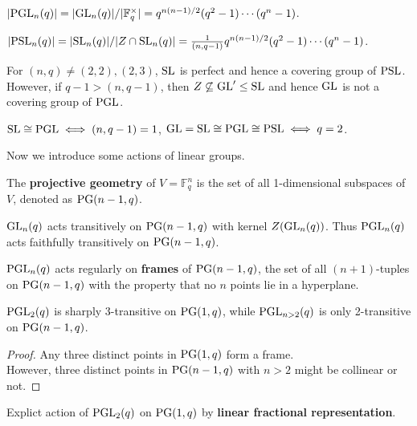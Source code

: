\documentclass[a4paper,11pt]{article}
\begin{document}
\begin{remark}
    $|\mathrm{PGL}_n(q)|=|\mathrm{GL}_n(q)|/|\mathbb{F}_q^\times|=q^{n(n-1)/2}(q^2-1)\cdots(q^n-1)$.

    $|\mathrm{PSL}_n(q)|=|\mathrm{SL}_n(q)|/|Z\cap \mathrm{SL}_n(q)|=\frac{1}{(n,q-1)}q^{n(n-1)/2}(q^2-1)\cdots(q^n-1)$.
\end{remark}

\begin{remark}
    For $(n,q)\neq (2,2),(2,3)$, $\mathrm{SL}$ is perfect and hence a covering group of $\mathrm{PSL}$. However, if $q-1>(n,q-1)$, then $Z\not\subseteq \mathrm{GL}'\leq \mathrm{SL}$ and hence $\mathrm{GL}$ is not a covering group of $\mathrm{PGL}$.
\end{remark}

\begin{proposition}
    $\mathrm{SL}\cong \mathrm{PGL} \iff (n,q-1)=1$, $\mathrm{GL}=\mathrm{SL}\cong\mathrm{PGL}\cong\mathrm{PSL} \iff q=2$.
\end{proposition}

Now we introduce some actions of linear groups.

\begin{definition}
    The \textbf{projective geometry} of $V=\mathbb{F}_q^n$ is the set of all 1-dimensional subspaces of $V$, denoted as $\mathrm{PG}(n-1,q)$.
\end{definition}

\begin{proposition}
    $\mathrm{GL}_n(q)$ acts transitively on $\mathrm{PG}(n-1,q)$ with kernel $Z(\mathrm{GL}_n(q))$. Thus $\mathrm{PGL}_n(q)$ acts faithfully transitively on $\mathrm{PG}(n-1,q)$. 
\end{proposition}


\begin{proposition}
    $\mathrm{PGL}_n(q)$ acts regularly on \textbf{frames} of $\mathrm{PG}(n-1,q)$, the set of all $(n+1)$-tuples on $\mathrm{PG}(n-1,q)$ with the property that no $n$ points lie in a hyperplane.
\end{proposition}

\begin{corollary}
    $\mathrm{PGL}_2(q)$ is sharply 3-transitive on $\mathrm{PG}(1,q)$, while $\mathrm{PGL}_{n>2}(q)$ is only 2-transitive on $\mathrm{PG}(n-1,q)$. 
\end{corollary}
\begin{proof}
    Any three distinct points in $\mathrm{PG}(1,q)$ form a frame. \\However, three distinct points in $\mathrm{PG}(n-1, q)$ with $n > 2$ might be collinear or not.
\end{proof}

\begin{remark}
    Explict action of $\mathrm{PGL}_2(q)$ on $\mathrm{PG}(1,q)$ by \textbf{linear fractional representation}.
\end{remark}
\end{document}
